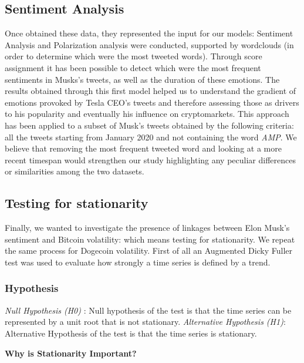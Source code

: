 \documentclass[
]{article}
\begin{document}
\hypertarget{sentiment-analysis}{%
\subsection{Sentiment Analysis}\label{sentiment-analysis}}

Once obtained these data, they represented the input for our models:
Sentiment Analysis and Polarization analysis were conducted, supported
by wordclouds (in order to determine which were the most tweeted words).
Through score assignment it has been possible to detect which were the
most frequent sentiments in Musks's tweets, as well as the duration of
these emotions. The results obtained through this first model helped us
to understand the gradient of emotions provoked by Tesla CEO's tweets
and therefore assessing those as drivers to his popularity and
eventually his influence on cryptomarkets. This approach has been
applied to a subset of Musk's tweets obtained by the following criteria:
all the tweets starting from January 2020 and not containing the word
\emph{AMP}. We believe that removing the most frequent tweeted word and
looking at a more recent timespan would strengthen our study
highlighting any peculiar differences or similarities among the two
datasets.

\hypertarget{testing-for-stationarity}{%
\subsection{Testing for stationarity}\label{testing-for-stationarity}}

Finally, we wanted to investigate the presence of linkages between Elon
Musk's sentiment and Bitcoin volatility: which means testing for
stationarity. We repeat the same process for Dogecoin volatility. First
of all an Augmented Dicky Fuller test was used to evaluate how strongly
a time series is defined by a trend.

\hypertarget{hypothesis}{%
\subsubsection{Hypothesis}\label{hypothesis}}

\emph{Null Hypothesis (H0)} : Null hypothesis of the test is that the
time series can be represented by a unit root that is not stationary.
\emph{Alternative Hypothesis (H1)}: Alternative Hypothesis of the test
is that the time series is stationary.

\textbf{Why is Stationarity Important?}
\end{document}

